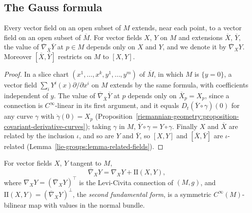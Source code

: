 \subsection{The Gauss formula}\label{riemannian-geometry:subsection-gauss-formula}

\begin{lemma}\label{riemannian-geometry:lemma-ambient-derivative}
Every vector field on an open subset of $M$ extends, near each point, to a vector field on an open subset of $\overline{M}$. For vector fields $X$, $Y$ on $M$ and
extensions $\overline{X}$, $\overline{Y}$, the value of $\overline{\nabla}_{\overline{X}}\overline{Y}$ at $p \in M$ depends only on $X$ and $Y$, and we denote it by
$\overline{\nabla}_XY$. Moreover $[\overline{X}, \overline{Y}]$ restricts on $M$ to $[X, Y]$.
\end{lemma}

\begin{proof}
In a slice chart $(x^1, \ldots, x^k, y^1, \ldots, y^m)$ of $\overline{M}$, in which $M$ is $\{y = 0\}$, a vector field $\sum_iY^i(x)\partial/\partial x^i$ on $M$ extends by
the same formula, with coefficients independent of $y$. The value of $\overline{\nabla}_{\overline{X}}\overline{Y}$ at $p$ depends only on $\overline{X}_p = X_p$, since a
connection is $C^\infty$-linear in its first argument, and it equals $D_t(\overline{Y} \circ \gamma)(0)$ for any curve $\gamma$ with $\dot\gamma(0) = X_p$
(Proposition~\ref{riemannian-geometry:proposition-covariant-derivative-curves}); taking $\gamma$ in $M$, $\overline{Y} \circ \gamma = Y \circ \gamma$. Finally $X$ and
$\overline{X}$ are related by the inclusion $\iota$, and so are $Y$ and $\overline{Y}$, so $[X, Y]$ and $[\overline{X}, \overline{Y}]$ are $\iota$-related
(Lemma~\ref{lie-groups:lemma-related-fields}).
\end{proof}

\begin{theorem}\label{riemannian-geometry:theorem-gauss-formula}
For vector fields $X$, $Y$ tangent to $M$,
\[
\overline{\nabla}_XY = \nabla_XY + \mathrm{II}(X, Y),
\]
where $\nabla_XY = (\overline{\nabla}_XY)^\top$ is the Levi-Civita connection of $(M, g)$, and $\mathrm{II}(X, Y) = (\overline{\nabla}_XY)^\perp$, the \emph{second fundamental
form}, is a symmetric $C^\infty(M)$-bilinear map with values in the normal bundle.
\end{theorem}

